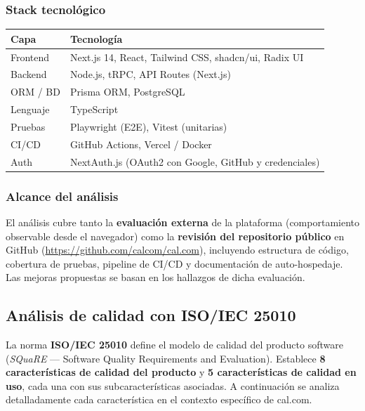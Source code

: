 \documentclass[12pt, a4paper]{article}
\begin{document}
\subsubsection*{Stack tecnológico}

\begin{center}
\begin{tabular}{ll}
\toprule
\textbf{Capa} & \textbf{Tecnología} \\
\midrule
Frontend & Next.js 14, React, Tailwind CSS, shadcn/ui, Radix UI \\
Backend  & Node.js, tRPC, API Routes (Next.js) \\
ORM / BD & Prisma ORM, PostgreSQL \\
Lenguaje & TypeScript \\
Pruebas  & Playwright (E2E), Vitest (unitarias) \\
CI/CD    & GitHub Actions, Vercel / Docker \\
Auth     & NextAuth.js (OAuth2 con Google, GitHub y credenciales) \\
\bottomrule
\end{tabular}
\end{center}

\subsubsection*{Alcance del análisis}

El análisis cubre tanto la \textbf{evaluación externa} de la plataforma (comportamiento
observable desde el navegador) como la \textbf{revisión del repositorio público} en
GitHub (\url{https://github.com/calcom/cal.com}), incluyendo estructura de código,
cobertura de pruebas, pipeline de CI/CD y documentación de auto-hospedaje. Las mejoras
propuestas se basan en los hallazgos de dicha evaluación.

\subsection{Análisis de calidad con ISO/IEC 25010}

La norma \textbf{ISO/IEC 25010} define el modelo de calidad del producto software
(\textit{SQuaRE} — Software Quality Requirements and Evaluation). Establece \textbf{8
características de calidad del producto} y \textbf{5 características de calidad en uso},
cada una con sus subcaracterísticas asociadas. A continuación se analiza detalladamente
cada característica en el contexto específico de cal.com.
\end{document}
